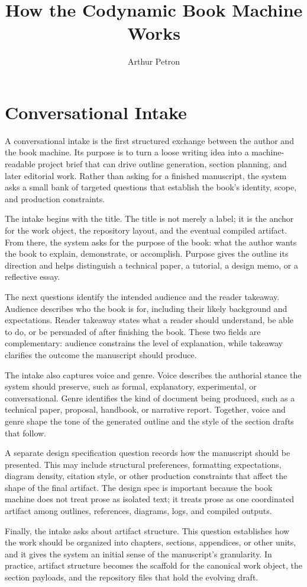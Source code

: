 \documentclass[11pt]{article}
\title{How the Codynamic Book Machine Works}
\author{Arthur Petron}
\begin{document}
\section*{Conversational Intake}

A conversational intake is the first structured exchange between the author and the book machine. Its purpose is to turn a loose writing idea into a machine-readable project brief that can drive outline generation, section planning, and later editorial work. Rather than asking for a finished manuscript, the system asks a small bank of targeted questions that establish the book's identity, scope, and production constraints.

The intake begins with the title. The title is not merely a label; it is the anchor for the work object, the repository layout, and the eventual compiled artifact. From there, the system asks for the purpose of the book: what the author wants the book to explain, demonstrate, or accomplish. Purpose gives the outline its direction and helps distinguish a technical paper, a tutorial, a design memo, or a reflective essay.

The next questions identify the intended audience and the reader takeaway. Audience describes who the book is for, including their likely background and expectations. Reader takeaway states what a reader should understand, be able to do, or be persuaded of after finishing the book. These two fields are complementary: audience constrains the level of explanation, while takeaway clarifies the outcome the manuscript should produce.

The intake also captures voice and genre. Voice describes the authorial stance the system should preserve, such as formal, explanatory, experimental, or conversational. Genre identifies the kind of document being produced, such as a technical paper, proposal, handbook, or narrative report. Together, voice and genre shape the tone of the generated outline and the style of the section drafts that follow.

A separate design specification question records how the manuscript should be presented. This may include structural preferences, formatting expectations, diagram density, citation style, or other production constraints that affect the shape of the final artifact. The design spec is important because the book machine does not treat prose as isolated text; it treats prose as one coordinated artifact among outlines, references, diagrams, logs, and compiled outputs.

Finally, the intake asks about artifact structure. This question establishes how the work should be organized into chapters, sections, appendices, or other units, and it gives the system an initial sense of the manuscript's granularity. In practice, artifact structure becomes the scaffold for the canonical work object, the section payloads, and the repository files that hold the evolving draft.
\end{document}
